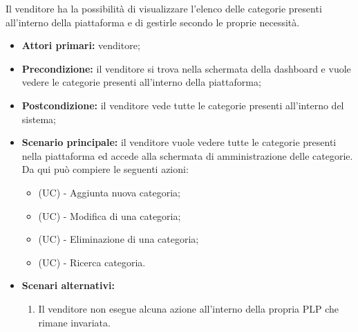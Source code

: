 Il venditore ha la possibilità di visualizzare l'elenco delle categorie presenti all'interno della piattaforma e di gestirle secondo le proprie necessità.
\begin{itemize}
	\item \textbf{Attori primari:} venditore;
	\item \textbf{Precondizione:} il venditore si trova nella schermata della dashboard e vuole vedere le categorie presenti all'interno della piattaforma;
	\item \textbf{Postcondizione:} il venditore vede tutte le categorie presenti all'interno del sistema;
	\item \textbf{Scenario principale:} il venditore vuole vedere tutte le categorie presenti nella piattaforma ed accede alla schermata di amministrazione delle categorie. Da qui può compiere le seguenti azioni:
	\begin{itemize}
		\item (UC) - Aggiunta nuova categoria;
		\item (UC) - Modifica di una categoria;
		\item (UC) - Eliminazione di una categoria;
		\item (UC) - Ricerca categoria.
	\end{itemize}
	\item \textbf{Scenari alternativi:}
	\begin{enumerate}[label=\lett]
		\item Il venditore non esegue alcuna azione all'interno della propria PLP che rimane invariata.
	\end{enumerate}
\end{itemize}

